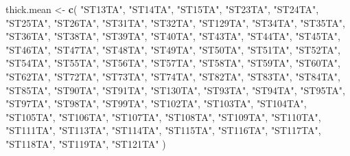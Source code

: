 \documentclass[
]{article}
\newenvironment{Shaded}{\begin{snugshade}}{\end{snugshade}}
\newcommand{\KeywordTok}[1]{\textcolor[rgb]{0.13,0.29,0.53}{\textbf{#1}}}
\newcommand{\NormalTok}[1]{#1}
\newcommand{\StringTok}[1]{\textcolor[rgb]{0.31,0.60,0.02}{#1}}
\begin{document}
\begin{Shaded}
\begin{Highlighting}[]
\NormalTok{thick.mean <-}\StringTok{ }\KeywordTok{c}\NormalTok{(}
  \StringTok{"ST13TA"}\NormalTok{, }\StringTok{"ST14TA"}\NormalTok{, }\StringTok{"ST15TA"}\NormalTok{, }\StringTok{"ST23TA"}\NormalTok{, }\StringTok{"ST24TA"}\NormalTok{, }\StringTok{"ST25TA"}\NormalTok{, }\StringTok{"ST26TA"}\NormalTok{, }\StringTok{"ST31TA"}\NormalTok{,}
  \StringTok{"ST32TA"}\NormalTok{, }\StringTok{"ST129TA"}\NormalTok{, }\StringTok{"ST34TA"}\NormalTok{, }\StringTok{"ST35TA"}\NormalTok{, }\StringTok{"ST36TA"}\NormalTok{, }\StringTok{"ST38TA"}\NormalTok{, }\StringTok{"ST39TA"}\NormalTok{, }\StringTok{"ST40TA"}\NormalTok{,}
  \StringTok{"ST43TA"}\NormalTok{, }\StringTok{"ST44TA"}\NormalTok{, }\StringTok{"ST45TA"}\NormalTok{, }\StringTok{"ST46TA"}\NormalTok{, }\StringTok{"ST47TA"}\NormalTok{,  }\StringTok{"ST48TA"}\NormalTok{, }\StringTok{"ST49TA"}\NormalTok{, }\StringTok{"ST50TA"}\NormalTok{,}
  \StringTok{"ST51TA"}\NormalTok{, }\StringTok{"ST52TA"}\NormalTok{, }\StringTok{"ST54TA"}\NormalTok{, }\StringTok{"ST55TA"}\NormalTok{, }\StringTok{"ST56TA"}\NormalTok{, }\StringTok{"ST57TA"}\NormalTok{, }\StringTok{"ST58TA"}\NormalTok{, }\StringTok{"ST59TA"}\NormalTok{, }
  \StringTok{"ST60TA"}\NormalTok{, }\StringTok{"ST62TA"}\NormalTok{, }\StringTok{"ST72TA"}\NormalTok{, }\StringTok{"ST73TA"}\NormalTok{, }\StringTok{"ST74TA"}\NormalTok{, }\StringTok{"ST82TA"}\NormalTok{, }\StringTok{"ST83TA"}\NormalTok{, }\StringTok{"ST84TA"}\NormalTok{, }
  \StringTok{"ST85TA"}\NormalTok{, }\StringTok{"ST90TA"}\NormalTok{, }\StringTok{"ST91TA"}\NormalTok{, }\StringTok{"ST130TA"}\NormalTok{, }\StringTok{"ST93TA"}\NormalTok{, }\StringTok{"ST94TA"}\NormalTok{, }\StringTok{"ST95TA"}\NormalTok{, }\StringTok{"ST97TA"}\NormalTok{, }
  \StringTok{"ST98TA"}\NormalTok{, }\StringTok{"ST99TA"}\NormalTok{, }\StringTok{"ST102TA"}\NormalTok{, }\StringTok{"ST103TA"}\NormalTok{, }\StringTok{"ST104TA"}\NormalTok{, }\StringTok{"ST105TA"}\NormalTok{, }\StringTok{"ST106TA"}\NormalTok{, }\StringTok{"ST107TA"}\NormalTok{,}
  \StringTok{"ST108TA"}\NormalTok{, }\StringTok{"ST109TA"}\NormalTok{, }\StringTok{"ST110TA"}\NormalTok{, }\StringTok{"ST111TA"}\NormalTok{, }\StringTok{"ST113TA"}\NormalTok{, }\StringTok{"ST114TA"}\NormalTok{, }\StringTok{"ST115TA"}\NormalTok{, }\StringTok{"ST116TA"}\NormalTok{,}
  \StringTok{"ST117TA"}\NormalTok{, }\StringTok{"ST118TA"}\NormalTok{, }\StringTok{"ST119TA"}\NormalTok{, }\StringTok{"ST121TA"}
\NormalTok{                )}
\end{Highlighting}
\end{Shaded}
\end{document}

